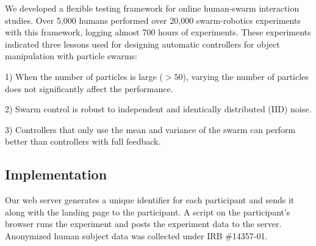 

We developed a flexible testing framework for online human-swarm interaction studies. Over 5,000 humans performed over 20,000 swarm-robotics experiments with this framework, logging almost 700 hours of experiments.
These experiments indicated three lessons used for designing automatic controllers for object manipulation with particle swarms:

1) When the number of particles is large ($>50$), varying the number of particles does not significantly affect the performance.

2) Swarm control is robust to independent and identically distributed (IID) noise.

3) Controllers that only use the mean and variance of the swarm can perform better than controllers with full feedback.


\subsection{Implementation}

Our web server generates a unique identifier for each participant and sends it along with the landing page to the participant. 
A script on the participant's browser runs the experiment and posts the experiment data to the server. 
Anonymized human subject data was collected under IRB \#14357-01.

